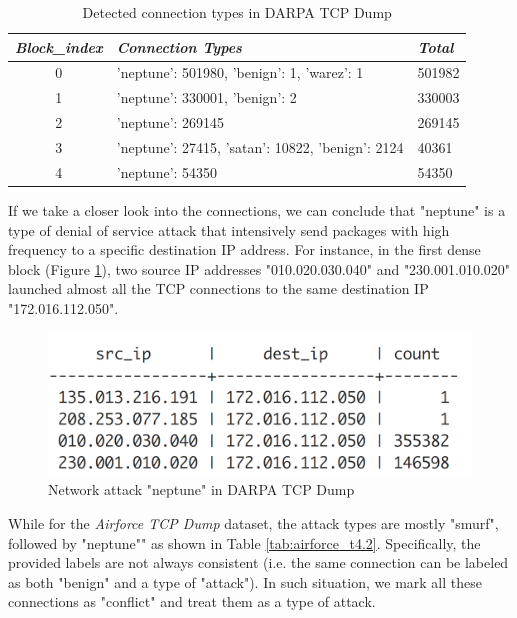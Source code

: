 \renewcommand{\arraystretch}{1.2}
\begin{table}[!ht]
\centering
\caption{Detected connection types in DARPA TCP Dump}
\label{tab:darpa_t4.2}
\begin{tabular}{|c|p{9cm}|p{2cm}|}
\hline
\textit{\textbf{Block\_index}} & \textit{\textbf{Connection Types}}  & \textit{\textbf{Total}} \\ \hline
{0}    & {'neptune': 501980, 'benign': 1, 'warez': 1}    & 501982                \\ \hline
{1}    & {'neptune': 330001, 'benign': 2}                & 330003               \\ \hline
{2}    & {'neptune': 269145}                 & 269145                           \\ \hline
{3}    & {'neptune': 27415, 'satan': 10822, 'benign': 2124}         & 40361     \\ \hline
{4}    & {'neptune': 54350}               & 54350                                \\ \hline
\end{tabular}
\end{table}

If we take a closer look into the connections, we can conclude that "neptune" is a type of denial of service attack that intensively send packages with high frequency to a specific destination IP address. For instance, in the first dense block (Figure \ref{fig:t4_neptune}), two source IP addresses "010.020.030.040" and "230.001.010.020" launched almost all the TCP connections to the same destination IP "172.016.112.050". 

\begin{figure}[!ht]
    \centering
    \includegraphics[scale=0.45]{T4_DARPA_1stDenseBlock.png}
    \caption{Network attack "neptune" in DARPA TCP Dump}
    \label{fig:t4_neptune}
\end{figure}


While for the \textit{Airforce TCP Dump} dataset, the attack types are mostly "smurf", followed by "neptune"" as shown in Table \ref{tab:airforce_t4.2}. Specifically, the provided labels are not always consistent (i.e. the same connection can be labeled as both "benign" and a type of "attack"). In such situation, we mark all these connections as "conflict" and treat them as a type of attack.

